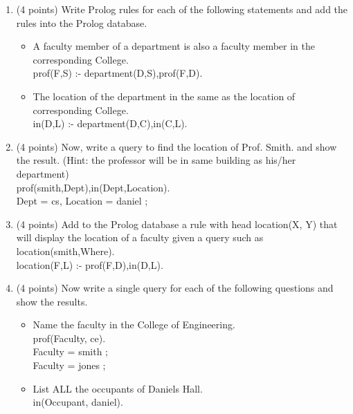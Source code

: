 \documentclass{article}%
\begin{document}
\begin{enumerate}
\begin{enumerate}
	\item (4 points) Write Prolog rules for each of the following statements and add the rules into the Prolog database.
		\begin{itemize}
		\item A faculty member of a department is also a faculty member in the corresponding College.\\
		
		prof(F,S) :- department(D,S),prof(F,D). \\
		\item The location of the department in the same as the location of corresponding College. \\
		
		in(D,L) :- department(D,C),in(C,L). \\
		\end{itemize}
	\item (4 points) Now, write a query to find the location of Prof. Smith. and show the result. (Hint: the professor will be in same building as his/her department) \\
	
	prof(smith,Dept),in(Dept,Location). \\
	
	Dept = cs,
Location = daniel ;
	
	\item (4 points) Add to the Prolog database a rule with head location(X, Y) that will display the location of a faculty given a query such as location(smith,Where).\\
	
	location(F,L) :- prof(F,D),in(D,L). \\
	\item (4 points) Now write a single query for each of the following questions and show the results.
		\begin{itemize}
		\item Name the faculty in the College of Engineering. \\
		
		prof(Faculty, ce).\\
		
		Faculty = smith ; \\

		Faculty = jones ;
		\item List ALL the occupants of Daniels Hall. \\
		
		in(Occupant, daniel).\\
		

\end{itemize}
\end{enumerate}
\end{enumerate}
\end{document}
